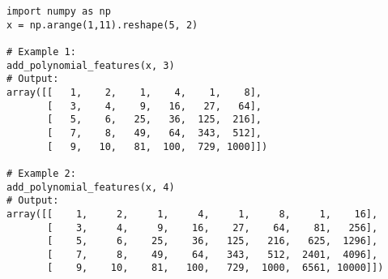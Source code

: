 \begin{verbatim}
import numpy as np
x = np.arange(1,11).reshape(5, 2)

# Example 1:
add_polynomial_features(x, 3)
# Output:
array([[   1,    2,    1,    4,    1,    8],
       [   3,    4,    9,   16,   27,   64],
       [   5,    6,   25,   36,  125,  216],
       [   7,    8,   49,   64,  343,  512],
       [   9,   10,   81,  100,  729, 1000]])

# Example 2:
add_polynomial_features(x, 4)
# Output:
array([[    1,     2,     1,     4,     1,     8,     1,    16],
       [    3,     4,     9,    16,    27,    64,    81,   256],
       [    5,     6,    25,    36,   125,   216,   625,  1296],
       [    7,     8,    49,    64,   343,   512,  2401,  4096],
       [    9,    10,    81,   100,   729,  1000,  6561, 10000]])
\end{verbatim}